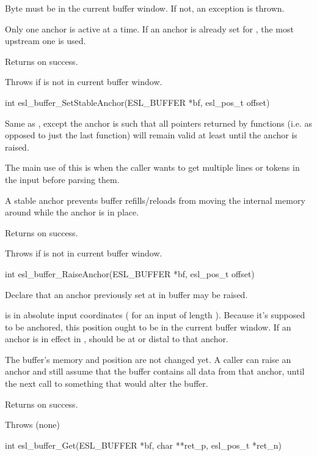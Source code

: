 \begin{sreapi}
Byte  must be in the current buffer window. If
not, an  exception is thrown.

Only one anchor is active at a time. If an anchor is
already set for , the most upstream one is used.

Returns  on success.

Throws  if  is not in current buffer window.


\hypertarget{func:esl_buffer_SetStableAnchor()}
{\item[int esl\_buffer\_SetStableAnchor(ESL\_BUFFER *bf, esl\_pos\_t offset)]}

Same as , except the anchor is
such that all pointers returned by  functions
(i.e. as opposed to just the last  function)
will remain valid at least until the anchor is raised.

The main use of this is when the caller wants to get
multiple lines or tokens in the input before parsing 
them. 

A stable anchor prevents buffer refills/reloads from
moving the internal memory around while the anchor is
in place.

Returns  on success.

Throws  if  is not in current buffer window.



\hypertarget{func:esl_buffer_RaiseAnchor()}
{\item[int esl\_buffer\_RaiseAnchor(ESL\_BUFFER *bf, esl\_pos\_t offset)]}

Declare that an anchor previously set at 
in buffer  may be raised. 

 is in absolute input coordinates ( for
an input of length ). Because it's supposed to be
anchored, this position ought to be in the current
buffer window. If an anchor is in effect in , 
 should be at or distal to that anchor.

The buffer's memory and position are not changed yet.  A
caller can raise an anchor and still assume that the
buffer contains all data from that anchor, until the
next call to something that would alter the buffer.

Returns  on success.

Throws (none)


\hypertarget{func:esl_buffer_Get()}
{\item[int esl\_buffer\_Get(ESL\_BUFFER *bf, char **ret\_p, esl\_pos\_t *ret\_n)]}


\end{sreapi}
